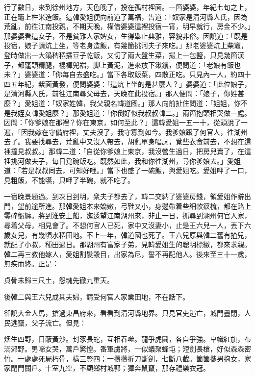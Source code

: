 行了數日，來到徐州地方，天色晚了，投在孤村裡面。一箇婆婆，年紀七旬之上，正在竈上杵米造飯。這韓愛姐便向前道了萬福，告道：「奴家是清河縣人氏，因為荒亂，前徃江南投親，不期天晚，權借婆婆這裡投宿一宵，明早就行，房金不少。」那婆婆看這女子，不是貧難人家婢女，生得舉止典雅，容貌非俗。因說道：「既是投宿，娘子請炕上坐，等老身造飯，有幾箇挑河夫子來吃。」那老婆婆炕上柴竈，登時做出一大鍋稗稻插豆子乾飯，又切了兩大盤生菜，撮上一包鹽，只見幾箇漢子，都蓬頭精腿，裩褲兜襠，脚上黃泥，進來放下鍬钁，便問道：「老娘有飯也未？」婆婆道：「你每自去盛吃。」當下各取飯菜，四散正吃。只見內一人，約四十四五年紀，紫面黃發，便問婆婆：「這炕上坐的是甚麼人？」婆婆道：「此位娘子，是清河縣人氏，前徃江南尋父母去，天晚在此投宿。」那人便問：「娘子，你姓甚麼？」愛姐道：「奴家姓韓，我父親名韓道國。」那人向前扯住問道：「姐姐，你不是我姪女韓愛姐麼？」那愛姐道：「你倒好似我叔叔韓二。」兩箇抱頭相哭做一處。因問：「你爹娘在那裡？你在東京，如何至此？」這韓愛姐一五一十，從頭說了一遍，「因我嫁在守備府裡，丈夫沒了，我守寡到如今。我爹娘跟了何官人，徃湖州去了。我要找尋去，荒亂中又沒人帶去，胡亂單身唱詞，覓些衣食前去，不想在這裡撞見叔叔。」那韓二道：「自從你爹娘上東京，我沒營生過日，把房兒賣了，在這裡挑河做夫子，每日覓碗飯吃。既然如此，我和你徃湖州，尋你爹娘去。」愛姐道：「若是叔叔同去，可知好哩。」當下也盛了一碗飯，與愛姐吃。愛姐呷了一口，見粗飯，不能嚥，只呷了半碗，就不吃了。

一宿晚景題過。到次日到明，衆夫子都去了，韓二交納了婆婆房錢，領愛姐作辭出門，望前途所進。那韓愛姐本來嬌嫩，弓鞋又小，身邊帶着些細軟釵梳，都在路上零碎盤纏。將到淮安上船，迤逶望江南湖州來，非止一日，抓尋到湖州何官人家，尋着父母，相見會了。不想何官人已死，家中又沒妻小，止是王六兒一人，丟下六歲女兒，有幾頃水稻田地。不上一年，韓道國也死了。王六兒原與韓二舊有揸兒，就配了小叔，種田過日。{}那湖州有富家子弟，見韓愛姐生的聰明標緻，都來求親。韓二再三教他嫁人，愛姐割髮毀目，出家為尼，誓不再配他人。{}後來至三十一歲，無疾而終。正是：

\begin{myquote}
貞骨未歸三尺土，怨魂先徹九重天。
\end{myquote}

後韓二與王六兒成其夫婦，請受何官人家業田地，不在話下。

卻說大金人馬，搶過東昌府來，看看到清河縣地界。只見官吏逃亡，城門晝閉，人民逃竄，父子流亡。但見：

\begin{myquote}
烟生四野，日蔽黃沙。封豕長蛇，互相吞噬。龍爭虎鬪，各自爭強。皁幟紅旗，布滿郊野。男啼女哭，萬戶驚惶。番軍虜將，一似蟻聚蜂屯；短劍長槍，好似森森密竹。一處處死屍朽骨，橫三豎四；一攢攢折刀斷劍，七斷八截。箇箇攜男抱女，家家閉門關戶。十室九空，不顯鄉村城郭；獐奔鼠竄，那存禮樂衣冠。
\end{myquote}

